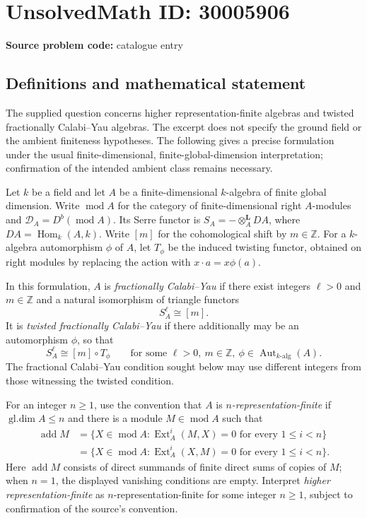 \documentclass[11pt]{article}
\newcommand{\Z}{\mathbb{Z}}
\begin{document}
\section*{UnsolvedMath ID: 30005906}
\textbf{Source problem code:} catalogue entry
\subsection{Definitions and mathematical statement}
The supplied question concerns higher representation-finite algebras and twisted fractionally Calabi--Yau algebras. The excerpt does not specify the ground field or the ambient finiteness hypotheses. The following gives a precise formulation under the usual finite-dimensional, finite-global-dimension interpretation; confirmation of the intended ambient class remains necessary.

Let \(k\) be a field and let \(A\) be a finite-dimensional \(k\)-algebra of finite global dimension. Write \(\operatorname{mod}A\) for the category of finite-dimensional right \(A\)-modules and \(\mathcal D_A=D^b(\operatorname{mod}A)\). Its Serre functor is \(S_A=-\otimes_A^{\mathbf L}DA\), where \(DA=\operatorname{Hom}_k(A,k)\). Write \([m]\) for the cohomological shift by \(m\in\Z\). For a \(k\)-algebra automorphism \(\phi\) of \(A\), let \(T_\phi\) be the induced twisting functor, obtained on right modules by replacing the action with \(x\cdot a=x\phi(a)\).

In this formulation, \(A\) is \emph{fractionally Calabi--Yau} if there exist integers \(\ell>0\) and \(m\in\Z\) and a natural isomorphism of triangle functors
\[
S_A^{\ell}\cong[m].
\]
It is \emph{twisted fractionally Calabi--Yau} if there additionally may be an automorphism \(\phi\), so that
\[
S_A^{\ell}\cong[m]\circ T_\phi
\qquad\text{for some }\ell>0,\ m\in\Z,\ \phi\in\operatorname{Aut}_{k\text{-alg}}(A).
\]
The fractional Calabi--Yau condition sought below may use different integers from those witnessing the twisted condition.

For an integer \(n\geq1\), use the convention that \(A\) is \emph{\(n\)-representation-finite} if \(\operatorname{gl.dim}A\leq n\) and there is a module \(M\in\operatorname{mod}A\) such that
\[
\begin{aligned}
\operatorname{add}M
&=\{X\in\operatorname{mod}A:\operatorname{Ext}_A^i(M,X)=0\text{ for every }1\leq i<n\}\\
&=\{X\in\operatorname{mod}A:\operatorname{Ext}_A^i(X,M)=0\text{ for every }1\leq i<n\}.
\end{aligned}
\]
Here \(\operatorname{add}M\) consists of direct summands of finite direct sums of copies of \(M\); when \(n=1\), the displayed vanishing conditions are empty. Interpret \emph{higher representation-finite} as \(n\)-representation-finite for some integer \(n\geq1\), subject to confirmation of the source's convention.
\end{document}
